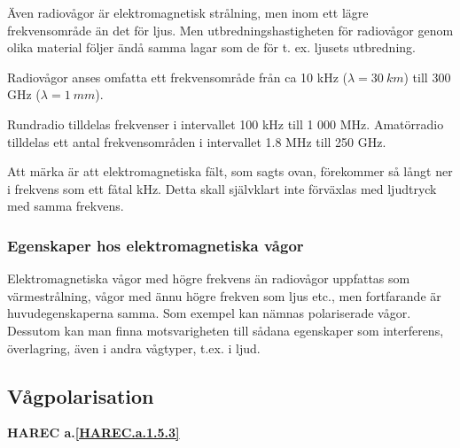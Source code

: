 Även radiovågor är elektromagnetisk strålning, men inom ett lägre
frekvensområde än det för ljus. Men utbredningshastigheten för radiovågor genom
olika material följer ändå samma lagar som de för t. ex. ljusets utbredning.

Radiovågor anses omfatta ett frekvensområde från ca 10 kHz
(\(\lambda = 30\ km\)) till 300 GHz (\(\lambda = 1\ mm\)).

Rundradio tilldelas frekvenser i intervallet 100 kHz till 1 000 MHz.
Amatörradio tilldelas ett antal frekvensområden i intervallet 1.8 MHz till
250 GHz.

Att märka är att elektromagnetiska fält, som sagts ovan, förekommer så långt
ner i frekvens som ett fåtal kHz. Detta skall självklart inte förväxlas med
ljudtryck med samma frekvens.

\subsubsection{Egenskaper hos elektromagnetiska vågor}

Elektromagnetiska vågor med högre frekvens än radiovågor uppfattas som
värmestrålning, vågor med ännu högre frekven som ljus etc., men fortfarande är
huvudegenskaperna samma. Som exempel kan nämnas polariserade vågor. Dessutom
kan man finna motsvarigheten till sådana egenskaper som interferens,
överlagring, även i andra vågtyper, t.ex. i ljud.

\subsection{Vågpolarisation}
\textbf{HAREC a.\ref{HAREC.a.1.5.3}\label{myHAREC.a.1.5.3}}
\label{vågpolarisation}

